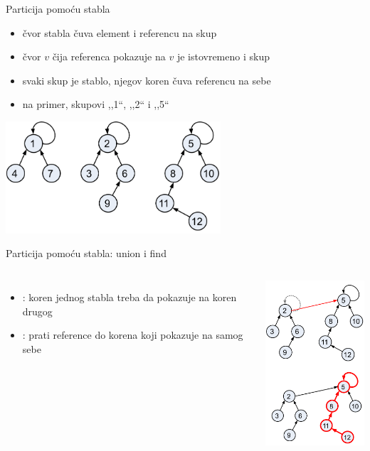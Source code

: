 \documentclass[compress,aspectratio=169]{beamer}
\begin{document}
\begin{frame}[t,fragile]{Particija pomoću stabla}
  \begin{itemize}
    \item čvor stabla čuva element i referencu na skup
    \item čvor $v$ čija referenca pokazuje na $v$ je istovremeno i skup
    \item svaki skup je stablo, njegov koren čuva referencu na sebe
    \item na primer, skupovi ,,1``, ,,2`` i ,,5``
  \end{itemize}
  \begin{center}
    \includegraphics[width=8cm]{asp-14-pic78.png}
  \end{center}
\end{frame}

\begin{frame}[t]{Particija pomoću stabla: union i find}
  \begin{columns}
    \column{7cm}
      \begin{itemize}
        \item {}: koren jednog stabla treba da pokazuje na
          koren drugog
        \item {}: prati reference do korena koji pokazuje na 
          samog sebe
      \end{itemize}
    \column{7cm}
      \begin{center}
        \includegraphics[width=4cm]{asp-14-pic79.png}
      \end{center}
  \end{columns}
\end{frame}
\end{document}
